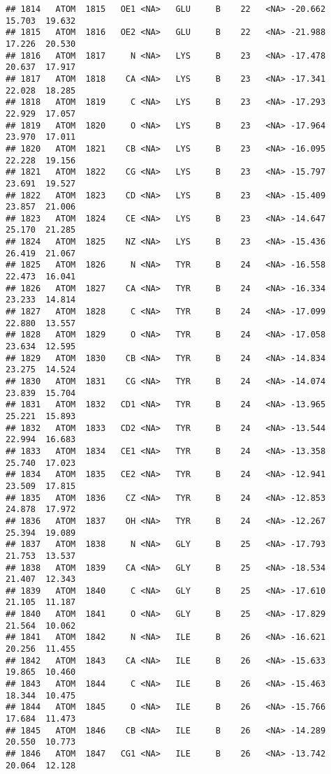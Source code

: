 \documentclass[
]{article}
\begin{document}
\begin{verbatim}
## 1814   ATOM  1815   OE1 <NA>   GLU     B    22   <NA> -20.662  15.703  19.632
## 1815   ATOM  1816   OE2 <NA>   GLU     B    22   <NA> -21.988  17.226  20.530
## 1816   ATOM  1817     N <NA>   LYS     B    23   <NA> -17.478  20.637  17.917
## 1817   ATOM  1818    CA <NA>   LYS     B    23   <NA> -17.341  22.028  18.285
## 1818   ATOM  1819     C <NA>   LYS     B    23   <NA> -17.293  22.929  17.057
## 1819   ATOM  1820     O <NA>   LYS     B    23   <NA> -17.964  23.970  17.011
## 1820   ATOM  1821    CB <NA>   LYS     B    23   <NA> -16.095  22.228  19.156
## 1821   ATOM  1822    CG <NA>   LYS     B    23   <NA> -15.797  23.691  19.527
## 1822   ATOM  1823    CD <NA>   LYS     B    23   <NA> -15.409  23.857  21.006
## 1823   ATOM  1824    CE <NA>   LYS     B    23   <NA> -14.647  25.170  21.285
## 1824   ATOM  1825    NZ <NA>   LYS     B    23   <NA> -15.436  26.419  21.067
## 1825   ATOM  1826     N <NA>   TYR     B    24   <NA> -16.558  22.473  16.041
## 1826   ATOM  1827    CA <NA>   TYR     B    24   <NA> -16.334  23.233  14.814
## 1827   ATOM  1828     C <NA>   TYR     B    24   <NA> -17.099  22.880  13.557
## 1828   ATOM  1829     O <NA>   TYR     B    24   <NA> -17.058  23.634  12.595
## 1829   ATOM  1830    CB <NA>   TYR     B    24   <NA> -14.834  23.275  14.524
## 1830   ATOM  1831    CG <NA>   TYR     B    24   <NA> -14.074  23.839  15.704
## 1831   ATOM  1832   CD1 <NA>   TYR     B    24   <NA> -13.965  25.221  15.893
## 1832   ATOM  1833   CD2 <NA>   TYR     B    24   <NA> -13.544  22.994  16.683
## 1833   ATOM  1834   CE1 <NA>   TYR     B    24   <NA> -13.358  25.740  17.023
## 1834   ATOM  1835   CE2 <NA>   TYR     B    24   <NA> -12.941  23.509  17.815
## 1835   ATOM  1836    CZ <NA>   TYR     B    24   <NA> -12.853  24.878  17.972
## 1836   ATOM  1837    OH <NA>   TYR     B    24   <NA> -12.267  25.394  19.089
## 1837   ATOM  1838     N <NA>   GLY     B    25   <NA> -17.793  21.753  13.537
## 1838   ATOM  1839    CA <NA>   GLY     B    25   <NA> -18.534  21.407  12.343
## 1839   ATOM  1840     C <NA>   GLY     B    25   <NA> -17.610  21.105  11.187
## 1840   ATOM  1841     O <NA>   GLY     B    25   <NA> -17.829  21.564  10.062
## 1841   ATOM  1842     N <NA>   ILE     B    26   <NA> -16.621  20.256  11.455
## 1842   ATOM  1843    CA <NA>   ILE     B    26   <NA> -15.633  19.865  10.460
## 1843   ATOM  1844     C <NA>   ILE     B    26   <NA> -15.463  18.344  10.475
## 1844   ATOM  1845     O <NA>   ILE     B    26   <NA> -15.766  17.684  11.473
## 1845   ATOM  1846    CB <NA>   ILE     B    26   <NA> -14.289  20.550  10.773
## 1846   ATOM  1847   CG1 <NA>   ILE     B    26   <NA> -13.742  20.064  12.128

\end{verbatim}
\end{document}
